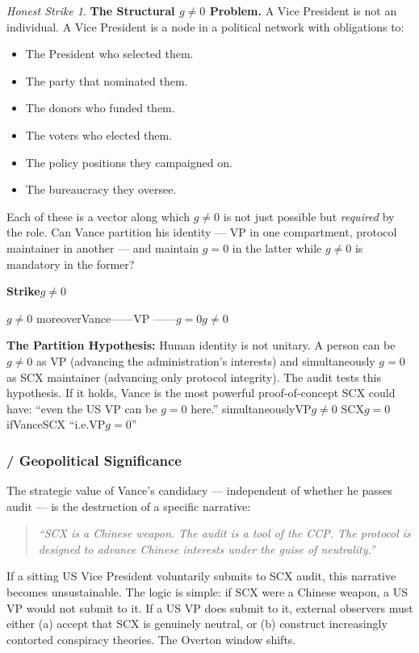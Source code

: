 \documentclass[12pt,a4paper]{article}
\theoremstyle{remark}
\newtheorem{honesthit}{Honest Strike}[section]
\newenvironment{hitbox}{%
  \begin{center}
  \color{critiquered}
  \begin{minipage}{0.92\textwidth}
  \begin{honesthit}
}{%
  \end{honesthit}
  \end{minipage}
  \end{center}
}
\begin{document}
\begin{hitbox}
\textbf{The Structural $g \neq 0$ Problem.}
A Vice President is not an individual. A Vice President is a node in a
political network with obligations to:
\begin{itemize}[leftmargin=*]
    \item The President who selected them.
    \item The party that nominated them.
    \item The donors who funded them.
    \item The voters who elected them.
    \item The policy positions they campaigned on.
    \item The bureaucracy they oversee.
\end{itemize}
Each of these is a vector along which $g \neq 0$ is not just possible but
\textit{required} by the role. Can Vance partition his identity — VP in one
compartment, protocol maintainer in another — and maintain $g=0$ in the
latter while $g \neq 0$ is mandatory in the former?

\textbf{Strike$g \neq 0$}


$g \neq 0$
moreover\textit{}Vance——VP
——$g=0$$g \neq 0$

\textbf{The Partition Hypothesis:} Human identity is not unitary. A person
can be $g \neq 0$ as VP (advancing the administration's interests) and
simultaneously $g=0$ as SCX maintainer (advancing only protocol integrity).
The audit tests this hypothesis. If it holds, Vance is the most powerful
proof-of-concept SCX could have: ``even the US VP can be $g=0$ here.''
\textbf{}simultaneouslyVP$g \neq 0$
SCX$g=0$
ifVanceSCX
“i.e.VP$g=0$”
\end{hitbox}

\subsubsection{ / Geopolitical Significance}

The strategic value of Vance's candidacy — independent of whether he passes
audit — is the destruction of a specific narrative:

\begin{quote}
\textit{``SCX is a Chinese weapon. The audit is a tool of the CCP. The
protocol is designed to advance Chinese interests under the guise of
neutrality.''}
\end{quote}

If a sitting US Vice President voluntarily submits to SCX audit, this
narrative becomes unsustainable. The logic is simple: if SCX were a Chinese
weapon, a US VP would not submit to it. If a US VP does submit to it,
external observers must either (a) accept that SCX is genuinely neutral, or
(b) construct increasingly contorted conspiracy theories. The Overton window
shifts.
\end{document}
